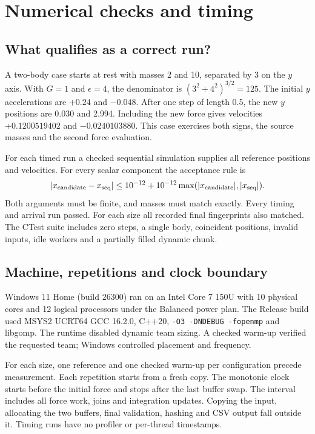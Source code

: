 \documentclass[11pt,a4paper]{article}
\newcommand{\topic}[1]{\clearpage\section*{#1}}
\newcommand{\subtopic}[1]{\subsection*{#1}}
\begin{document}
\topic{Numerical checks and timing}
\subtopic{What qualifies as a correct run?}
A two-body case starts at rest with masses 2 and 10, separated by 3 on the
$y$ axis. With $G=1$ and $\epsilon=4$, the denominator is
$(3^2+4^2)^{3/2}=125$. The initial $y$ accelerations are $+0.24$ and
$-0.048$. After one step of length 0.5, the new $y$ positions are
0.030 and 2.994. Including the new force gives velocities
$+0.1200519402$ and $-0.0240103880$. This case exercises both signs, the
source masses and the second force evaluation.

For each timed run a checked sequential simulation supplies all reference
positions and velocities. For every scalar component the acceptance rule is
\[
  |x_{\rm candidate}-x_{\rm seq}|
  \le 10^{-12}+10^{-12}\max(|x_{\rm candidate}|,|x_{\rm seq}|).
\]
Both arguments must be finite, and masses must match exactly. Every timing
and arrival run passed. For each size all recorded final fingerprints also
matched. The CTest suite includes zero steps, a single body, coincident
positions, invalid inputs, idle workers and a partially filled dynamic chunk.

\subtopic{Machine, repetitions and clock boundary}
Windows 11 Home (build 26300) ran on an Intel Core 7 150U with 10 physical
cores and 12 logical processors under the Balanced power plan. The Release
build used MSYS2 UCRT64 GCC 16.2.0, C++20, \texttt{-O3 -DNDEBUG -fopenmp}
and libgomp. The runtime disabled dynamic team sizing. A checked warm-up
verified the requested team; Windows controlled placement and frequency.

For each size, one reference and one checked warm-up per configuration precede
measurement. Each repetition starts from a fresh copy. The monotonic clock
starts before the initial force and stops after the last buffer swap. The
interval includes all force work, joins and integration updates. Copying the
input, allocating the two buffers, final validation, hashing and CSV output
fall outside it. Timing runs have no profiler or per-thread timestamps.
\end{document}
